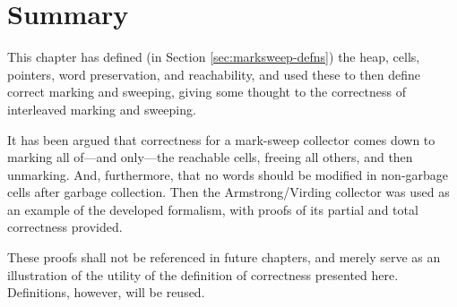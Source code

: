 \section{Summary}
\label{sec:marksweep-summary}

This chapter has defined (in Section \ref{sec:marksweep-defns}) the
heap, cells, pointers, word preservation, and reachability, and used
these to then define correct marking and sweeping, giving some thought
to the correctness of interleaved marking and sweeping.

It has been argued that correctness for a mark-sweep collector comes
down to marking all of---and only---the reachable cells, freeing all
others, and then unmarking. And, furthermore, that no words should be
modified in non-garbage cells after garbage collection. Then the
Armstrong/Virding\cite{Armstrong95} collector was used as an example
of the developed formalism, with proofs of its partial and total
correctness provided.

These proofs shall not be referenced in future chapters, and merely
serve as an illustration of the utility of the definition of
correctness presented here. Definitions, however, will be reused.

